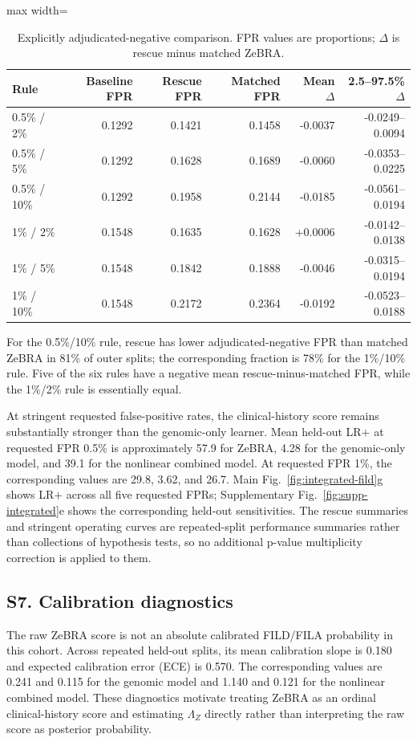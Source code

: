 \begin{table}[!t]
\caption{Explicitly adjudicated-negative comparison. FPR values are proportions; $\Delta$ is rescue minus matched ZeBRA.}
\label{tab:supp-adjudicated}
\centering\scriptsize
\setlength{\tabcolsep}{3.5pt}
\renewcommand{\arraystretch}{1.03}
\begin{adjustbox}{max width=\textwidth}
\begin{tabular}{lrrrrr}
\toprule
Rule & Baseline FPR & Rescue FPR & Matched FPR & Mean $\Delta$ & 2.5--97.5\% $\Delta$\\
\midrule
0.5\% / 2\%  & 0.1292 & 0.1421 & 0.1458 & -0.0037 & -0.0249--0.0094\\
0.5\% / 5\%  & 0.1292 & 0.1628 & 0.1689 & -0.0060 & -0.0353--0.0225\\
0.5\% / 10\% & 0.1292 & 0.1958 & 0.2144 & -0.0185 & -0.0561--0.0194\\
1\% / 2\%    & 0.1548 & 0.1635 & 0.1628 & +0.0006 & -0.0142--0.0138\\
1\% / 5\%    & 0.1548 & 0.1842 & 0.1888 & -0.0046 & -0.0315--0.0194\\
1\% / 10\%   & 0.1548 & 0.2172 & 0.2364 & -0.0192 & -0.0523--0.0188\\
\bottomrule
\end{tabular}
\end{adjustbox}
\end{table}

For the 0.5\%/10\% rule, rescue has lower adjudicated-negative FPR than matched ZeBRA in 81\% of outer splits; the corresponding fraction is 78\% for the 1\%/10\% rule. Five of the six rules have a negative mean rescue-minus-matched FPR, while the 1\%/2\% rule is essentially equal.

At stringent requested false-positive rates, the clinical-history score remains substantially stronger than the genomic-only learner. Mean held-out LR$+$ at requested FPR 0.5\% is approximately 57.9 for ZeBRA, 4.28 for the genomic-only model, and 39.1 for the nonlinear combined model. At requested FPR 1\%, the corresponding values are 29.8, 3.62, and 26.7. Main Fig.~\ref{fig:integrated-fild}g shows LR$+$ across all five requested FPRs; Supplementary Fig.~\ref{fig:supp-integrated}e shows the corresponding held-out sensitivities. The rescue summaries and stringent operating curves are repeated-split performance summaries rather than collections of hypothesis tests, so no additional p-value multiplicity correction is applied to them.

\subsection*{S7. Calibration diagnostics}
The raw ZeBRA score is not an absolute calibrated FILD/FILA probability in this cohort. Across repeated held-out splits, its mean calibration slope is 0.180 and expected calibration error (ECE) is 0.570. The corresponding values are 0.241 and 0.115 for the genomic model and 1.140 and 0.121 for the nonlinear combined model. These diagnostics motivate treating ZeBRA as an ordinal clinical-history score and estimating $\Lambda_Z$ directly rather than interpreting the raw score as posterior probability.

